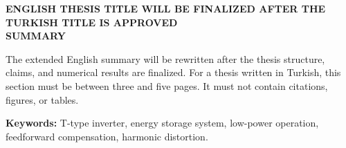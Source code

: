 \cleardoublepage
\thispagestyle{plain}
\begingroup
\singlespacing

\vspace*{72pt}
\begin{center}
  \bfseries ENGLISH THESIS TITLE WILL BE FINALIZED AFTER THE TURKISH TITLE IS APPROVED\\[18pt]
  SUMMARY
\end{center}

The extended English summary will be rewritten after the thesis structure, claims, and numerical results are finalized. For a thesis written in Turkish, this section must be between three and five pages. It must not contain citations, figures, or tables.

\textbf{Keywords:} T-type inverter, energy storage system, low-power operation, feedforward compensation, harmonic distortion.
\endgroup
